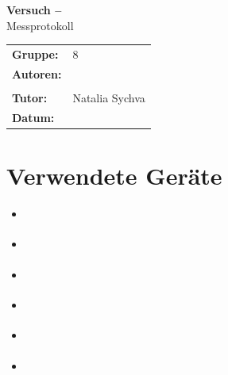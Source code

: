 \documentclass{article}
\begin{document}
\pagestyle{fancy}

\begin{center}
	{\LARGE\bfseries Versuch \underline{\hspace{1.5cm}} -- \underline{\hspace{7cm}}} \\[0.4cm]
	{\large Messprotokoll}
\end{center}

\vspace{0.5cm}

\begin{tabular}{ll}
	\textbf{Gruppe:} & 8 \\[10pt]
	\textbf{Autoren:} & \underline{\hspace{8cm}} \\[10pt]
	                  & \underline{\hspace{8cm}} \\[10pt]
	\textbf{Tutor:} & Natalia Sychva \\[10pt]
	\textbf{Datum:} & \underline{\hspace{8cm}} \\[10pt]
\end{tabular}

\section{Verwendete Geräte}

\begin{itemize}
	\item \underline{\hspace{12cm}}
	\item \underline{\hspace{12cm}}
	\item \underline{\hspace{12cm}}
	\item \underline{\hspace{12cm}}
	\item \underline{\hspace{12cm}}
	\item \underline{\hspace{12cm}}
\end{itemize}
\end{document}

